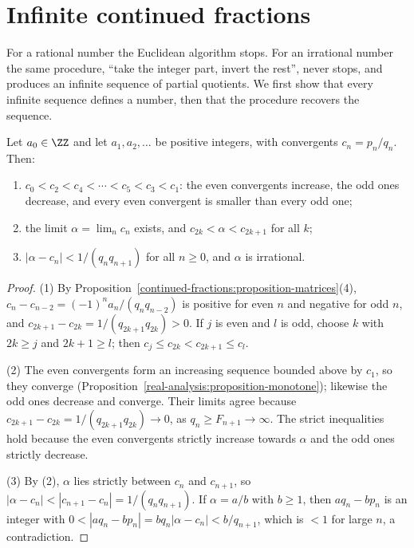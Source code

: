 \section{Infinite continued fractions}\label{continued-fractions:section-infinite}

For a rational number the Euclidean algorithm stops. For an irrational number the same procedure, ``take the integer part, invert the rest'', never stops, and produces an infinite sequence of
partial quotients. We first show that every infinite sequence defines a number, then that the procedure recovers the sequence.

\begin{theorem}\label{continued-fractions:theorem-infinite}
Let $a_0 \in \ZZ$ and let $a_1, a_2, \ldots$ be positive integers, with convergents $c_n = p_n/q_n$. Then:
\begin{enumerate}
\item $c_0 < c_2 < c_4 < \cdots < c_5 < c_3 < c_1$: the even convergents increase, the odd ones decrease, and every even convergent is smaller than every odd one;
\item the limit $\alpha = \lim_n c_n$ exists, and $c_{2k} < \alpha < c_{2k+1}$ for all $k$;
\item $|\alpha - c_n| < 1/(q_nq_{n+1})$ for all $n \geq 0$, and $\alpha$ is irrational.
\end{enumerate}
\end{theorem}

\begin{proof}
(1) By Proposition~\ref{continued-fractions:proposition-matrices}(4), $c_n - c_{n-2} = (-1)^na_n/(q_nq_{n-2})$ is positive for even $n$ and negative for odd $n$, and
$c_{2k+1} - c_{2k} = 1/(q_{2k+1}q_{2k}) > 0$. If $j$ is even and $l$ is odd, choose $k$ with $2k \geq j$ and $2k + 1 \geq l$; then $c_j \leq c_{2k} < c_{2k+1} \leq c_l$.

(2) The even convergents form an increasing sequence bounded above by $c_1$, so they converge (Proposition~\ref{real-analysis:proposition-monotone}); likewise the odd ones decrease and converge.
Their limits agree because $c_{2k+1} - c_{2k} = 1/(q_{2k+1}q_{2k}) \to 0$, as $q_n \geq F_{n+1} \to \infty$. The strict inequalities hold because the even convergents strictly increase towards $\alpha$
and the odd ones strictly decrease.

(3) By (2), $\alpha$ lies strictly between $c_n$ and $c_{n+1}$, so $|\alpha - c_n| < |c_{n+1} - c_n| = 1/(q_nq_{n+1})$. If $\alpha = a/b$ with $b \geq 1$, then $aq_n - bp_n$ is an integer with
$0 < |aq_n - bp_n| = bq_n|\alpha - c_n| < b/q_{n+1}$, which is $< 1$ for large $n$, a contradiction.
\end{proof}

